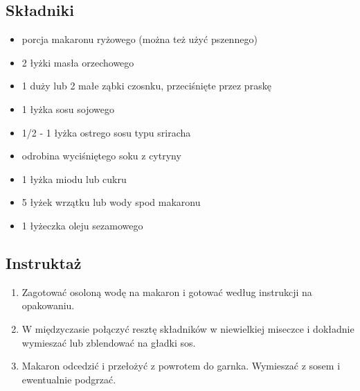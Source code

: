 \documentclass[a4paper,10pt]{book}
\begin{document}
\begin{multicols}{2}

\subsection*{Składniki} 
\begin{itemize} 
    \item porcja makaronu ryżowego (można też użyć pszennego) 
    \item 2 łyżki masła orzechowego 
    \item 1 duży lub 2 małe ząbki czosnku, przeciśnięte przez praskę 
    \item 1 łyżka sosu sojowego 
    \item 1/2 - 1 łyżka ostrego sosu typu sriracha 
    \item odrobina wyciśniętego soku z cytryny 
    \item 1 łyżka miodu lub cukru 
    \item 5 łyżek wrzątku lub wody spod makaronu
    \item 1 łyżeczka oleju sezamowego 
\end{itemize}

\columnbreak

\begin{figure}[H] \centering 
\end{figure}

\end{multicols}

\vspace{0.5cm}

\subsection*{Instruktaż} 
\begin{enumerate} 
    \item Zagotować osoloną wodę na makaron i gotować według instrukcji na opakowaniu.
    \item W międzyczasie połączyć resztę składników w niewielkiej miseczce i dokładnie wymieszać lub zblendować na gładki sos. 
    \item Makaron odcedzić i przełożyć z powrotem do garnka. Wymieszać z sosem i ewentualnie podgrzać. 
\end{enumerate}
\end{document}
